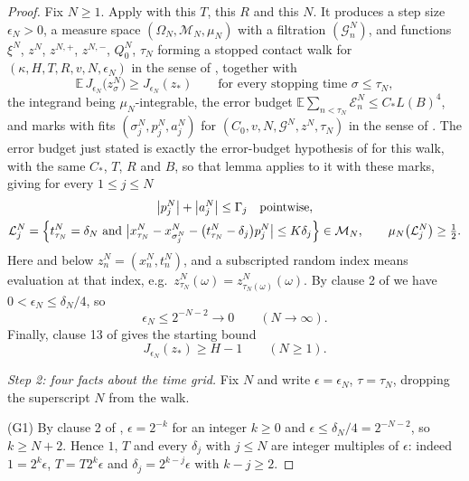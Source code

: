 \begin{proof}
Fix $N\ge1$. Apply  with this $T$, this $R$ and
this $N$. It produces a step size $\epsilon_N>0$, a measure space
$(\Omega_N,\mathcal M_N,\mu_N)$ with a filtration $(\mathcal G^N_n)$, and
functions $\xi^N$, $z^N$, $z^{N,+}$, $z^{N,-}$, $Q^N_0$, $\tau_N$ forming a
stopped contact walk for $(\kappa,H,T,R,v,N,\epsilon_N)$ in the sense of
, together with
\begin{equation}\label{eq:cp-stopped-expectation}
  \mathbb E\,J_{\epsilon_N}\bigl(z^N_\sigma\bigr)\ge J_{\epsilon_N}(z_*)
  \qquad\text{for every stopping time }\sigma\le\tau_N,
\end{equation}
the integrand being $\mu_N$-integrable, the error budget
$\mathbb E\sum_{n<\tau_N}\mathcal E^N_n\le C_*L(B)^4$, and marks with fits
$(\sigma^N_j,p^N_j,a^N_j)$ for $(C_0,v,N,\mathcal G^N,z^N,\tau_N)$ in the sense
of . The error budget just stated is exactly the error-budget hypothesis of
 for this walk, with the same $C_*$, $T$, $R$ and
$B$, so that lemma applies to it with these marks, giving for every
$1\le j\le N$
\begin{gather}
  \bigl|p^N_j\bigr|+\bigl|a^N_j\bigr|\le\Gamma_j
    \quad\text{pointwise},\label{eq:cp-gamma}\\
  \mathcal L^N_j=\Bigl\{t^N_{\tau_N}=\delta_N\ \text{and}\
    \bigl|x^N_{\tau_N}-x^N_{\sigma^N_j}
      -\bigl(t^N_{\tau_N}-\delta_j\bigr)p^N_j\bigr|\le K\delta_j\Bigr\}
  \in\mathcal M_N,\qquad
  \mu_N\bigl(\mathcal L^N_j\bigr)\ge\tfrac12 .\label{eq:cp-localization}
\end{gather}
Here and below $z^N_n=(x^N_n,t^N_n)$, and a subscripted random index means
evaluation at that index, e.g.\ $z^N_{\tau_N}(\omega)=z^N_{\tau_N(\omega)}(\omega)$.
By clause 2 of \noderef{IsContactWalk} we have $0<\epsilon_N\le\delta_N/4$, so
\begin{equation}\label{eq:cp-eps-to-zero}
  \epsilon_N\le 2^{-N-2}\longrightarrow0\qquad(N\to\infty).
\end{equation}
Finally, clause 13 of  gives the starting bound
\begin{equation}\label{eq:cp-start}
  J_{\epsilon_N}(z_*)\ge H-1\qquad(N\ge1).
\end{equation}

\emph{Step 2: four facts about the time grid.}
Fix $N$ and write $\epsilon=\epsilon_N$, $\tau=\tau_N$, dropping the
superscript $N$ from the walk.

(G1) By clause 2 of , $\epsilon=2^{-k}$ for an integer
$k\ge0$ and $\epsilon\le\delta_N/4=2^{-N-2}$, so $k\ge N+2$. Hence $1$, $T$ and
every $\delta_j$ with $j\le N$ are integer multiples of $\epsilon$: indeed
$1=2^k\epsilon$, $T=T2^k\epsilon$ and $\delta_j=2^{k-j}\epsilon$ with
$k-j\ge2$.


\end{proof}
